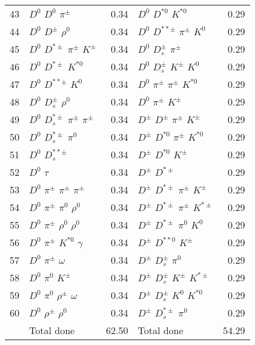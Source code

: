\documentclass[6pt]{article}
\begin{document}
\begin{tabular}{rlr|lr}
43 & $D^0$ $D^0$ $\pi^{\pm}$ & 0.34 & $D^0$ $D^{*0}$ $K^{*0}$ & 0.29 \\
44 & $D^0$ $D^{\pm}$ $\rho^0$ & 0.34 & $D^0$ $D^{**\pm}$ $\pi^{\pm}$ $K^0$ & 0.29 \\
45 & $D^0$ $D^{*\pm}$ $\pi^{\pm}$ $K^{\pm}$ & 0.34 & $D^0$ $D_s^{\pm}$ $\pi^{\pm}$ & 0.29 \\
46 & $D^0$ $D^{*\pm}$ $K^{*0}$ & 0.34 & $D^0$ $D_s^{\pm}$ $K^{\pm}$ $K^0$ & 0.29 \\
47 & $D^0$ $D^{**\pm}$ $K^0$ & 0.34 & $D^0$ $\pi^{\pm}$ $\pi^{\pm}$ $K^{*0}$ & 0.29 \\
48 & $D^0$ $D_s^{\pm}$ $\rho^0$ & 0.34 & $D^0$ $\pi^{\pm}$ $K^{\pm}$ & 0.29 \\
49 & $D^0$ $D_s^{*\pm}$ $\pi^{\pm}$ $\pi^{\pm}$ & 0.34 & $D^{\pm}$ $D^{\pm}$ $\pi^{\pm}$ $K^{\pm}$ & 0.29 \\
50 & $D^0$ $D_s^{*\pm}$ $\pi^0$ & 0.34 & $D^{\pm}$ $D^{*0}$ $\pi^{\pm}$ $K^{*0}$ & 0.29 \\
51 & $D^0$ $D_s^{**\pm}$ & 0.34 & $D^{\pm}$ $D^{*0}$ $K^{\pm}$ & 0.29 \\
52 & $D^0$ $\tau$ & 0.34 & $D^{\pm}$ $D^{*\pm}$ & 0.29 \\
53 & $D^0$ $\pi^{\pm}$ $\pi^{\pm}$ $\pi^{\pm}$ & 0.34 & $D^{\pm}$ $D^{*\pm}$ $\pi^{\pm}$ $K^{\pm}$ & 0.29 \\
54 & $D^0$ $\pi^{\pm}$ $\pi^0$ $\rho^0$ & 0.34 & $D^{\pm}$ $D^{*\pm}$ $\pi^{\pm}$ $K^{*\pm}$ & 0.29 \\
55 & $D^0$ $\pi^{\pm}$ $\rho^0$ $\rho^0$ & 0.34 & $D^{\pm}$ $D^{*\pm}$ $\pi^0$ $K^0$ & 0.29 \\
56 & $D^0$ $\pi^{\pm}$ $K^{*0}$ $\gamma$ & 0.34 & $D^{\pm}$ $D^{**0}$ $K^{\pm}$ & 0.29 \\
57 & $D^0$ $\pi^{\pm}$ $\omega$ & 0.34 & $D^{\pm}$ $D_s^{\pm}$ $\pi^0$ & 0.29 \\
58 & $D^0$ $\pi^0$ $K^{\pm}$ & 0.34 & $D^{\pm}$ $D_s^{\pm}$ $K^{\pm}$ $K^{*\pm}$ & 0.29 \\
59 & $D^0$ $\pi^0$ $\rho^{\pm}$ $\omega$ & 0.34 & $D^{\pm}$ $D_s^{\pm}$ $K^0$ $K^{*0}$ & 0.29 \\
60 & $D^0$ $\rho^{\pm}$ $\rho^0$ & 0.34 & $D^{\pm}$ $D_s^{*\pm}$ $\pi^0$ & 0.29 \\
\hline & Total done & 62.50 & Total done & 54.29\\
\end{tabular}
\end{document}
